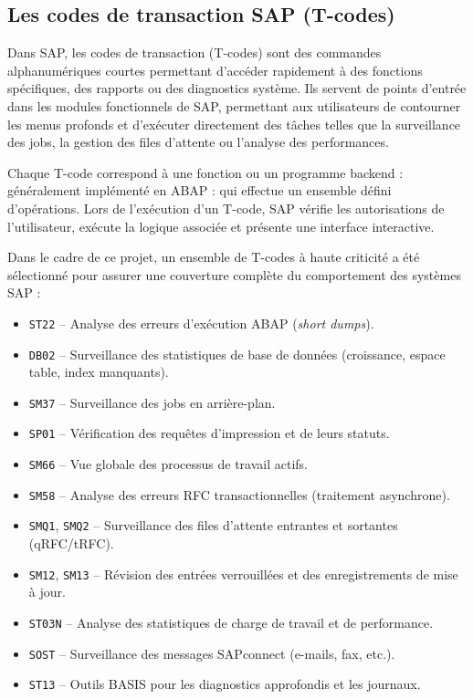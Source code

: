 \subsection{Les codes de transaction SAP (T-codes)}

Dans SAP, les codes de transaction (T-codes) sont des commandes alphanumériques courtes
permettant d'accéder rapidement à des fonctions spécifiques, des rapports ou des
diagnostics système. Ils servent de points d'entrée dans les modules fonctionnels de SAP,
permettant aux utilisateurs de contourner les menus profonds et d'exécuter directement
des tâches telles que la surveillance des jobs, la gestion des files d'attente ou
l'analyse des performances.

Chaque T-code correspond à une fonction ou un programme backend : généralement implémenté
en ABAP : qui effectue un ensemble défini d'opérations. Lors de l'exécution d'un T-code,
SAP vérifie les autorisations de l'utilisateur, exécute la logique associée et présente
une interface interactive.

Dans le cadre de ce projet, un ensemble de T-codes à haute criticité a été sélectionné
pour assurer une couverture complète du comportement des systèmes SAP :

\begin{itemize}[leftmargin=*, label=\textbullet]
  \item \texttt{ST22} – Analyse des erreurs d'exécution ABAP (\textit{short dumps}).
  \item \texttt{DB02} – Surveillance des statistiques de base de données (croissance,
        espace table, index manquants).
  \item \texttt{SM37} – Surveillance des jobs en arrière-plan.
  \item \texttt{SP01} – Vérification des requêtes d'impression et de leurs statuts.
  \item \texttt{SM66} – Vue globale des processus de travail actifs.
  \item \texttt{SM58} – Analyse des erreurs RFC transactionnelles (traitement asynchrone).
  \item \texttt{SMQ1}, \texttt{SMQ2} – Surveillance des files d'attente entrantes et
        sortantes (qRFC/tRFC).
  \item \texttt{SM12}, \texttt{SM13} – Révision des entrées verrouillées et des
        enregistrements de mise à jour.
  \item \texttt{ST03N} – Analyse des statistiques de charge de travail et de performance.
  \item \texttt{SOST} – Surveillance des messages SAPconnect (e-mails, fax, etc.).
  \item \texttt{ST13} – Outils BASIS pour les diagnostics approfondis et les journaux.
\end{itemize}

